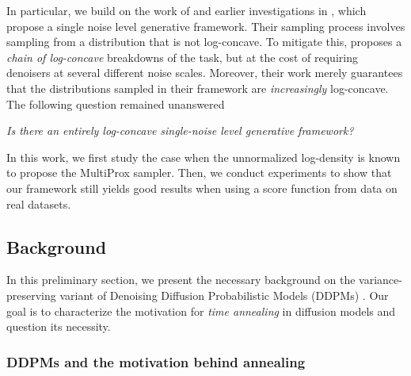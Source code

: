In particular, we build on the work of \cite{saremi_multimeasurement_2021} and earlier investigations in \cite{jain_journey_2022}, which propose a single noise level generative framework. Their sampling process involves sampling from a distribution that is not log-concave. To mitigate this, \cite{saremi_chain_2023} proposes a \emph{chain of log-concave} breakdowns of the task, but at the cost of requiring denoisers at several different noise scales. Moreover, their work merely guarantees that the distributions sampled in their framework are \emph{increasingly} log-concave. The following question remained unanswered
\begin{center}
    \emph{Is there an entirely log-concave single-noise level generative framework?}
\end{center}

In this work, we first study the case when the unnormalized log-density is known to propose the MultiProx sampler. Then, we conduct experiments to show that our framework still yields good results when using a score function from data on real datasets. 



\subsection{Background}
\label{sec:background_multiprox}

In this preliminary section, we present the necessary background on the variance-preserving variant of Denoising Diffusion Probabilistic Models (DDPMs) \cite{ho_denoising_2020}. Our goal is to characterize the motivation for \emph{time annealing} in diffusion models and question its necessity. 

\subsubsection{DDPMs and the motivation behind annealing}


